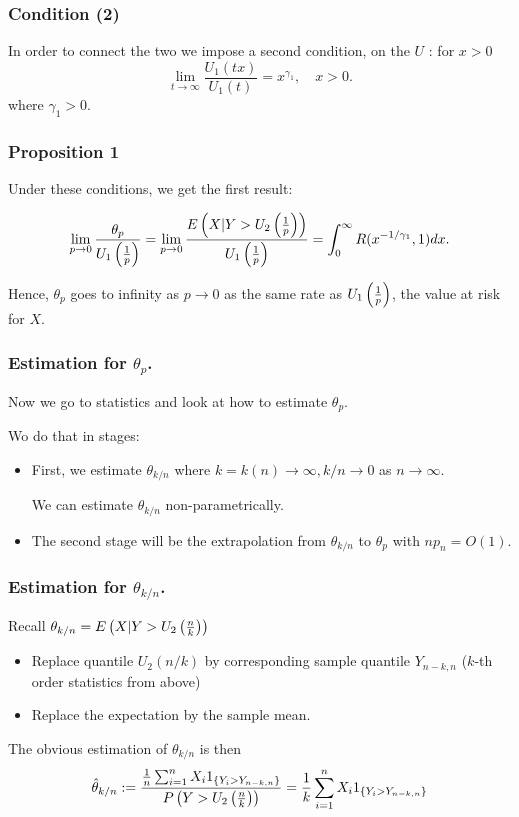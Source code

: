 \documentclass{beamer}
\begin{document}
\begin{frame}
    \frametitle{Condition (2)}
    In order to connect the two we impose a second
    condition, on the $U$ : for $x>0$
    $$
    \lim_{t\to \infty} \frac{U_1(tx)}{U_1(t)} = x^{\gamma_1}, \quad x>0.
    $$
where $\gamma_1>0$. 


\end{frame}



\begin{frame}
    \frametitle{Proposition 1}
Under these conditions, we get the first result:

$$
\lim_{p\to 0} \frac{\theta_p}{U_1\left(\frac{1}{p}\right)} = \lim_{p\to 0} \frac{E\left(X|Y>U_2\left(\frac{1}{p}\right)\right)}{U_1\left(\frac{1}{p}\right)} = \int_0^{\infty} R(x^{-1/\gamma_1},1)dx.
$$

\medskip

Hence, $\theta_p$ goes to infinity as $p\to 0$ as the same rate as $U_1\left(\frac{1}{p}\right)$, the value at risk for $X$.

\end{frame}


\begin{frame}
    \frametitle{Estimation for $\theta_p$.}
    Now we go to statistics and look at how to
    estimate $\theta_p$.

    Wo do that in stages:
    \begin{itemize}
        \item First, we estimate $\theta_{k/n}$ where $ k =k(n)\to\infty, k/n \to 0$ as $n \to \infty$.
        
        We can estimate $\theta_{k/n}$ non-parametrically.

        \item The second stage will be the extrapolation from $\theta_{k/n}$ to $\theta_p$ with $np_n=O(1)$.
    \end{itemize}

    

\end{frame}

\begin{frame}
    \frametitle{Estimation for $\theta_{k/n}$.}

Recall $\theta_{k/n} =E\left(X|Y>U_2\left(\frac{n}{k}\right)\right)$

\begin{itemize}
    \item Replace quantile $U_2(n/k)$ by corresponding sample quantile $Y_{n-k,n}$ ($k$-th order statistics from above)
    \item Replace the expectation by the sample mean.

\end{itemize}

The obvious estimation of $\theta_{k/n}$ is then 
$$
\hat{\theta}_{k/n}:= \frac{\frac{1}{n}\sum_{i=1}^n X_i 1_{\left\{Y_i>Y_{n-k,n}\right\}}}{P\left(Y>U_2\left(\frac{n}{k}\right)\right)} = \frac{1}{k}\sum_{i=1}^n X_i 1_{\left\{Y_i>Y_{n-k,n}\right\}}
$$
\end{frame}
\end{document}
